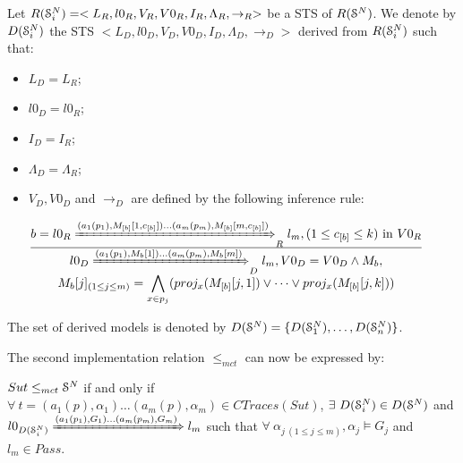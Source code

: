 \begin{definition}
    Let
    $R(\EuScript{S}_i^{N})=<L_R,l0_R,V_R,V0_R,I_R,\Lambda_R,\rightarrow_R>$
    be a STS of $R(\EuScript{S}^{N})$. We denote by
    $D(\EuScript{S}_i^{N})$ the STS $
    <L_D,l0_D,V_D,V0_D,I_D,\Lambda_D,\rightarrow_D>$ derived from
    $R(\EuScript{S}_i^{N})$ such that:

    \begin{itemize}
        \item $L_D=L_{R}$;

        \item $l0_D=l0_{R}$;

        \item $I_D=I_{R}$;

        \item $\Lambda_D=\Lambda_{R}$;

        \item $V_D, V0_D$ and $\rightarrow_D$ are defined by the
            following inference rule:

            $\frac{
                \begin{matrix}
                b=l0_{R}
                \xRightarrow{(a_1(p_1),M_{[b]}[1,c_{[b]}])\dots
                (a_m(p_m),M_{[b]}[m,c_{[b]}])}_{R}
                l_{m},
                (1 \leq c_{[b]} \leq k) \text{ in } V0_{R}
                \end{matrix}
            }
            {
                \begin{matrix}
                l0_D
                \xRightarrow{(a_1(p_1),M_{b}[1])\dots (a_m(p_m),M_{b}[m])}_{D}
                l_m, V0_D=V0_D \wedge M_{b},\\
                M_{b}[j]_{(1\leq j \leq m)} = \displaystyle
                \bigwedge_{x \in p_j} ( proj_x(M_{[b]}[j, 1])
                \vee \dots \vee proj_x(M_{[b]}[j, k]))

                \end{matrix}
            }$
    \end{itemize}

    The set of derived models is denoted by $D(\EuScript{S}^{N}) =
    \{D(\EuScript{S}_1^{N}),\dots,D(\EuScript{S}_n^{N}) \}$.
\end{definition}

The second implementation relation $\leq_{mct}$ can now be
expressed by:

\begin{proposition}
    ${Sut} \leq_{mct} \EuScript{S}^{N}$ if and only if $\forall
    ~t= (a_1(p), \alpha_1) \dots (a_m(p), \alpha_m) \in CTraces({Sut})$,
    $\exists ~D(\EuScript{S}_i^{N}) \in D(\EuScript{S}^{N})$ and
    $l0_{D(\EuScript{S}_i^{N})} \xRightarrow{(a_1(p_1),G_{1})
    \dots (a_m(p_m),G_{m})} l_m$ such that $\forall
    ~\alpha_{j ~(1 \leq j \leq m)}, \alpha_j \models G_{j}$ and
    $l_m \in Pass$.
\end{proposition}


